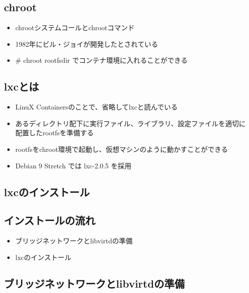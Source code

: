 \documentclass[mingoth,a4paper]{jsarticle}
\begin{document}
\subsection[containsverbatim]{chroot}
  \begin{itemize}
  \item chrootシステムコールとchrootコマンド
  \item 1982年にビル・ジョイが開発したとされている
  \item \# chroot rootfsdir でコンテナ環境に入れることができる
  \end{itemize}





\subsection[containsverbatim]{lxcとは}
  \begin{itemize}
  \item LinuX Containersのことで、省略してlxcと読んでいる
  \item あるディレクトリ配下に実行ファイル、ライブラリ、設定ファイルを適切に配置したrootfsを準備する
  \item rootfsをchroot環境で起動し、仮想マシンのように動かすことができる
  \item Debian 9 Stretch では lxc-2.0.5 を採用
  \end{itemize}



\subsection{lxcのインストール}

\subsection[containsverbatim]{インストールの流れ}
  \begin{itemize}
  \item ブリッジネットワークとlibvirtdの準備
  \item lxcのインストール
  \end{itemize}



\subsection[containsverbatim]{ブリッジネットワークとlibvirtdの準備}
\end{document}
